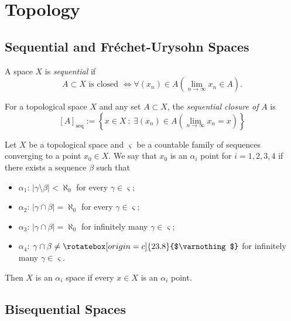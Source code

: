 \documentclass{article}
\newcommand{\seqcl}[1]{{[#1]_{\text{seq}}}}
\newcommand{\nothing}{\rotatebox[origin=c]{23.8}{$\varnothing$}}
\begin{document}
\section{Topology}

\subsection{Sequential and Fréchet-Urysohn Spaces}

\begin{defn}\cite{EK89}
    A space \(X\) is \textit{sequential} if 
    \[
    \displaystyle A \subset X \text{ is closed } \iff \forall (x_n) \in A\left(\lim_{n\to \infty} x_n \in A\right).
    \] 
\end{defn}

\begin{defn}\cite{AH90}
    For a topological space \(X\) and any set \(A \subset X\), the \textit{sequential closure of} \(A\) is  
    \[
        \seqcl{A} := \left\{x \in X \: : \: \exists (x_n) \in A \left(\lim_{n\to \infty} x_n = x\right) \right\}
    \]

\end{defn}

\begin{defn}\cite{NY92}
    Let \(X\) be a topological space and \(\varsigma\) be a countable family of sequences converging to a point \(x_0 \in X\). We say that \(x_0\) is an \(\alpha_i\) point for \(i = 1, 2, 3, 4\) if there exists a sequence \(\beta\) such that 
    \begin{itemize}
        \item \(\alpha_1\):  \(|\gamma \setminus \beta| < \aleph_0\) for every \(\gamma \in \varsigma\);
        \item \(\alpha_2\): \(|\gamma \cap \beta| = \aleph_0\) for every \(\gamma \in \varsigma\);
        \item \(\alpha_3\): \(|\gamma \cap \beta| = \aleph_0\) for infinitely many \(\gamma \in \varsigma\);
        \item \(\alpha_4\): \(\gamma \cap \beta \neq \nothing\) for infinitely many \(\gamma \in \varsigma\).
    \end{itemize}
    Then \(X\) is an \(\alpha_i\) space if every \(x \in X\) is an \(\alpha_i\) point.
\end{defn}





\subsection{Bisequential Spaces}
\end{document}
